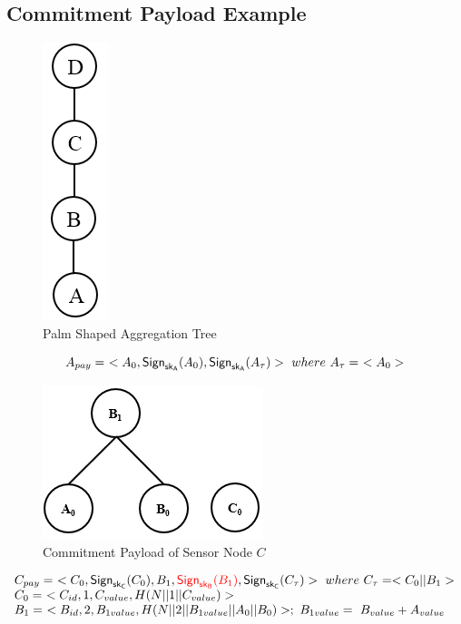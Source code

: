 \documentclass[%
  slidesonly,%
  semlayer%
  ]{seminar}                                  %
\newcommand{\sk}{\sf{sk}}
\begin{document}
\begin{slide}
    \subsection*{Commitment Payload Example}
      \begin{figure}[h!]
        \centering
        \includegraphics[scale = 0.5]{images/palm-aggregation-tree.png}
        \caption{Palm Shaped Aggregation Tree}
        \label{fig:Palm aggregation tree}
      \end{figure}

      \begin{equation*}
        A_{pay} =\ <A_{0}, \textsf{Sign}_{\sk_{A}}(A_{0}), \textsf{Sign}_{\sk_{A}}(A_{\tau}) >\ where\ A_{\tau} =\ < A_{0} > 
      \end{equation*}

      \begin{figure}[h!]
        \centering
        \includegraphics[scale = 0.5]{images/commitment-payload-of-C.png}
        \caption{Commitment Payload of Sensor Node $C$}
        \label{fig:Commitment payload of C}
      \end{figure}

      \begin{equation*}  
        \begin{array}{l}
          C_{pay} =\ <C_{0},\textsf{Sign}_{\sk_{C}}(C_{0}),B_{1},\textcolor{red}{\textsf{Sign}_{\sk_{B}}(B_{1})}, \textsf{Sign}_{\sk_{C}}(C_{\tau})>\ where\ C_{\tau} = <C_{0} || B_{1}>\\
          C_{0} =\ <C_{id}, 1, C_{value}, H(N||1||C_{value})>\\
          B_{1} =\ <B_{id}, 2, B_{1value}, H(N||2||B_{1value}||A_{0}||B_{0})>;\ B_{1value} =\ B_{value} + A_{value}
        \end{array}
      \end{equation*}
      \clearpage


\end{slide}
\end{document}
